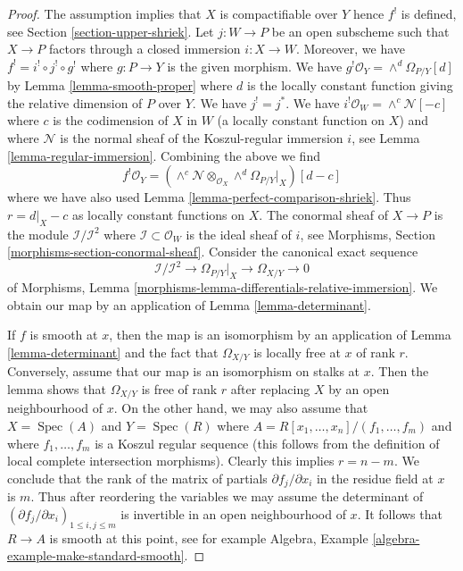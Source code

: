 \documentclass{stacks-project}
\theoremstyle{plain}
\theoremstyle{definition}
\theoremstyle{remark}
\numberwithin{equation}{subsection}
\def\Spec{\mathop{\mathrm{Spec}}}
\begin{document}
\begin{proof}
The assumption implies that $X$ is compactifiable over $Y$ hence $f^!$
is defined, see Section \ref{section-upper-shriek}.
Let $j : W \to P$ be an open subscheme such that
$X \to P$ factors through a closed immersion $i : X \to W$.
Moreover, we have $f^! = i^! \circ j^! \circ g^!$ where
$g : P \to Y$ is the given morphism.
We have $g^!\mathcal{O}_Y = \wedge^d\Omega_{P/Y}[d]$ by
Lemma \ref{lemma-smooth-proper} where $d$ is the locally
constant function giving the relative dimension of $P$ over $Y$.
We have $j^! = j^*$. We have $i^!\mathcal{O}_W = \wedge^c\mathcal{N}[-c]$
where $c$ is the codimension of $X$ in $W$ (a locally constant
function on $X$) and where $\mathcal{N}$ is the normal sheaf of
the Koszul-regular immersion $i$, see Lemma \ref{lemma-regular-immersion}.
Combining the above we find
$$
f^!\mathcal{O}_Y =
\left(\wedge^c\mathcal{N} \otimes_{\mathcal{O}_X}
\wedge^d\Omega_{P/Y}|_X\right)[d - c]
$$
where we have also used Lemma \ref{lemma-perfect-comparison-shriek}.
Thus $r = d|_X - c$ as locally constant functions on $X$.
The conormal sheaf of $X \to P$ is the module
$\mathcal{I}/\mathcal{I}^2$ where $\mathcal{I} \subset \mathcal{O}_W$
is the ideal sheaf of $i$, see
Morphisms, Section \ref{morphisms-section-conormal-sheaf}.
Consider the canonical exact sequence
$$
\mathcal{I}/\mathcal{I}^2 \to
\Omega_{P/Y}|_X \to \Omega_{X/Y} \to 0
$$
of Morphisms, Lemma \ref{morphisms-lemma-differentials-relative-immersion}.
We obtain our map by an application of Lemma \ref{lemma-determinant}.

\medskip\noindent
If $f$ is smooth at $x$, then the map is an isomorphism by an application of
Lemma \ref{lemma-determinant}
and the fact that $\Omega_{X/Y}$ is locally free at $x$
of rank $r$. Conversely, assume that our map is an isomorphism on stalks
at $x$. Then the lemma shows that $\Omega_{X/Y}$ is free of rank $r$
after replacing $X$ by an open neighbourhood of $x$.
On the other hand, we may also assume that $X = \Spec(A)$ and
$Y = \Spec(R)$ where $A = R[x_1, \ldots, x_n]/(f_1, \ldots, f_m)$
and where $f_1, \ldots, f_m$ is a Koszul regular sequence
(this follows from the definition of local complete intersection morphisms).
Clearly this implies $r = n - m$. We conclude that the rank of the matrix
of partials $\partial f_j/\partial x_i$ in the residue field at $x$ is $m$.
Thus after reordering the variables we may assume
the determinant of $(\partial f_j/\partial x_i)_{1 \leq i, j \leq m}$
is invertible in an open neighbourhood of $x$. It follows
that $R \to A$ is smooth at this point, see for example
Algebra, Example \ref{algebra-example-make-standard-smooth}.
\end{proof}
\end{document}
